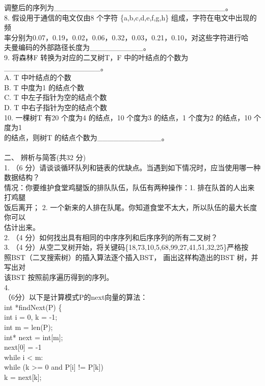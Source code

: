 \begin{question}
调整后的序列为\_\_\_\_\_\_\_\_\_\_\_\_\_\_\_\_\_\_\_\_\_\_\_\_\_\_\_\_\_\_\_\_。\\
8. 假设用于通信的电文仅由8 个字符 \{a,b,c,d,e,f,g,h\} 组成，字符在电文中出现的频\\
率分别为0.07，0.19，0.02，0.06，0.32，0.03，0.21，0.10，对这些字符进行哈\\
夫曼编码的外部路径长度为\_\_\_\_\_\_\_\_\_\_。\\
9. 将森林F 转换为对应的二叉树T，F 中的叶结点的个数为\_\_\_\_\_\_\_\_\_\_\_\_\_\_\_\_\_\_。\\
A. T 中叶结点的个数\\
B. T 中度为1 的结点个数\\
C. T 中左子指针为空的结点个数\\
D. T 中右子指针为空的结点个数\\
10. 一棵树T 有20 个度为4 的结点，10 个度为3 的结点，1 个度为2 的结点，10 个度为1\\
的结点，则树T 的结点个数为\_\_\_\_\_\_\_\_\_\_\_\_。\\
\\
二、 辨析与简答(共32 分)\\
1. （6 分）请谈谈循环队列和链表的优缺点。当遇到如下情况时，应当使用哪一种数据结构？\\
情况：你要维护食堂鸡腿饭的排队队伍，队伍有两种操作：1. 排在队首的人出来打鸡腿\\
饭后离开； 2. 一个新来的人排在队尾。你知道食堂不太大，所以队伍的最大长度你可以\\
估计出来。\\
2. （4 分）如何找出具有相同的中序序列和后序序列的所有二叉树？\\
3. （4 分）从空二叉树开始，将关键码\{18,73,10,5,68,99,27,41,51,32,25\}严格按\\
照BST（二叉搜索树）的插入算法逐个插入BST， 画出这样构造出的BST 树，并写出对\\
该BST 按照前序遍历得到的序列。\\
4.\\
（6分）以下是计算模式P的next向量的算法：\\
int *findNext(P) \{\\
int i = 0,  k = -1;\\
int m = len(P);\\
int* next = int[m];\\
next[0] = -1\\
while i < m:\\
while (k >= 0 and P[i] != P[k])\\
k = next[k];\\

\end{question}
